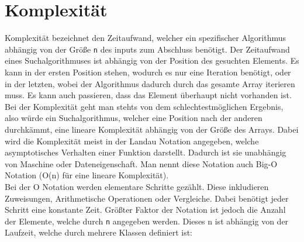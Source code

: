 \documentclass{article}
\begin{document}
	\section{Komplexität}
	\label{sec:Komplexität}
	Komplexität bezeichnet den Zeitaufwand, welcher ein spezifischer Algorithmus abhängig von der Größe \verb|n| des inputs zum Abschluss benötigt. Der Zeitaufwand eines Suchalgorithmuses ist abhängig von der Position des gesuchten Elements. Es kann in der ersten Position stehen, wodurch es nur eine Iteration benötigt, oder in der letzten, wobei der Algorithmus dadurch durch das gesamte Array iterieren muss. Es kann auch passieren, dass das Element überhaupt nicht vorhanden ist. Bei der Komplexität geht man stehts von dem schlechtestmöglichen Ergebnis, also würde ein Suchalgorithmus, welcher eine Position nach der anderen durchkämmt, eine lineare Komplexität abhängig von der Größe des Arrays. Dabei wird die Komplexität meist in der Landau Notation angegeben, welche asymptotisches Verhalten einer Funktion darstellt. Dadurch ist sie unabhängig von Maschine oder Dateneigenschaft. Man nennt diese Notation auch Big-O Notation (O(n) für eine lineare Komplexität). \\
	Bei der O Notation werden elementare Schritte gezählt. Diese inkludieren Zuweisungen, Arithmetische Operationen oder Vergleiche. Dabei benötigt jeder Schritt eine konstante Zeit. Größter Faktor der Notation ist jedoch die Anzahl der Elemente, welche durch \verb|n| angegeben werden. Dieses n ist abhängig von der Laufzeit, welche durch mehrere Klassen definiert ist:
\end{document}
